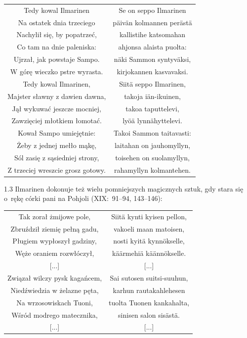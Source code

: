 \documentclass[11pt,a4paper,twoside]{report}
\begin{document}
{\centering
\small
\begin{longtable}{c c}
Tedy kowal Ilmarinen & Se on seppo Ilmarinen \\
Na ostatek dnia trzeciego & päivän kolmannen perästä \\
Nachylił się, by popatrzeć, & kallistihe katsomahan \\
Co tam na dnie paleniska: & ahjonsa alaista puolta: \\
Ujrzał, jak powstaje Sampo. & näki Sammon syntyväksi, \\
W górę wieczko pstre wyrasta. & kirjokannen kasvavaksi. \\
Tedy kowal Ilmarinen, & Siitä seppo Ilmarinen, \\
Majster sławny z dawien dawna, & takoja iän-ikuinen, \\
Jął wykuwać jeszcze mocniej, & takoa taputtelevi, \\
Zawzięciej młotkiem łomotać. & lyöä lynnähyttelevi. \\
Kował Sampo umiejętnie: & Takoi Sammon taitavasti: \\
Żeby z jednej mełło mąkę, & laitahan on jauhomyllyn, \\
Sól zasię z sąsiedniej strony, & toisehen on suolamyllyn, \\
Z trzeciej wreszcie grosz gotowy. & rahamyllyn kolmantehen. \\
\end{longtable}
}
\begin{spacing}{1.3}
Ilmarinen dokonuje też wielu pomniejszych magicznych sztuk, gdy stara się o~rękę córki pani na Pohjoli (XIX:~91--94, 143--146):
\end{spacing}
{\centering
\small
\begin{longtable}{c c}
Tak zorał żmijowe pole, & Siitä kynti kyisen pellon, \\
Zbruździł ziemię pełną gadu, & vakoeli maan matoisen, \\
Pługiem wypłoszył gadziny, & nosti kyitä kynnökselle, \\
Węże oraniem rozwłóczył, & käärmehiä käännökselle. \\
{[...]} & {[...]} \\
Związał wilczy pysk kagańcem, & Sai sutosen suitsi-suuhun, \\
Niedźwiedzia w żelazne pęta, & karhun rautakahlehesen \\
Na wrzosowiskach Tuoni, & tuolta Tuonen kankahalta, \\
Wśród modrego matecznika, & sinisen salon sisästä. \\
{[...]} & {[...]} \\
\end{longtable}
}
\end{document}
